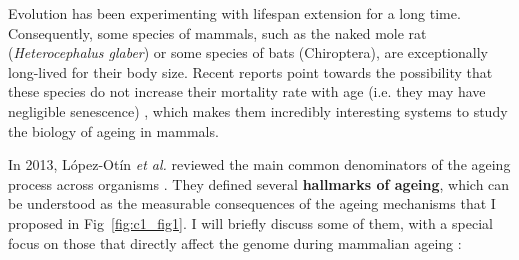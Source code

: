 \bigskip

Evolution has been experimenting with lifespan extension for a long time. Consequently, some species of mammals, such as the naked mole rat (\textit{Heterocephalus glaber}) or some species of bats (Chiroptera), are exceptionally long-lived for their body size. Recent reports point towards the possibility that these species do not increase their mortality rate with age (i.e. they may have negligible senescence) \citep{Ruby2018,Fleischer2017}, which makes them incredibly interesting systems to study the biology of ageing in mammals. 

\bigskip

In 2013, L\'opez-Ot\'in \textit{et al.} reviewed the main common denominators of the ageing process across organisms \citep{Lopez-Otin2013}. They defined several \textbf{hallmarks of ageing}, which can be understood as the measurable consequences of the ageing mechanisms that I proposed in Fig~\ref{fig:c1_fig1}. I will briefly discuss some of them, with a special focus on those that directly affect the genome during mammalian ageing  \citep{Lopez-Otin2013,Singh2019}:


